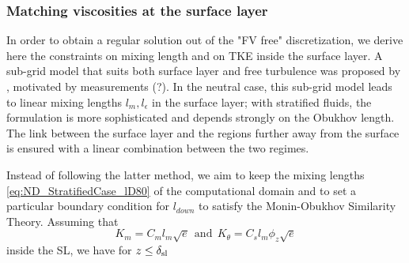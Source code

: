 \subsubsection{Matching viscosities at the surface layer}
\label{sec:ND_StratifiedCase_mixing_lengths_match}
In order to obtain a regular solution out of the "FV free"
discretization, we derive here the constraints on mixing length
and on TKE inside the surface layer.
A sub-grid model that suits both
surface layer and free turbulence was proposed by
\citep{redelsperger_simple_2001},
{\color{red}motivated by measurements (?)}.
In the neutral case, this sub-grid model leads to linear
mixing lengths $l_m, l_{\epsilon}$ in the surface layer;
with stratified fluids, the formulation is more sophisticated
and depends strongly on the Obukhov length.
The link between the surface layer and the regions
further away from the surface is ensured with a linear combination
between the two regimes.
%
\par
Instead of following the latter method,
we aim to keep the mixing lengths \eqref{eq:ND_StratifiedCase_lD80}
of the computational domain and
to set a particular boundary condition for $l_{down}$
to satisfy the Monin-Obukhov Similarity Theory.
Assuming that 
\begin{equation}
	\label{eq:ND_StratifiedCase_viscosities_assumption}
K_m = C_m l_m \sqrt{e} ~~\text{and}~~
K_\theta = C_s l_m \phi_z \sqrt{e}
\end{equation}
 inside the SL, we have
for $z\leq \delta_{\rm sl}$
